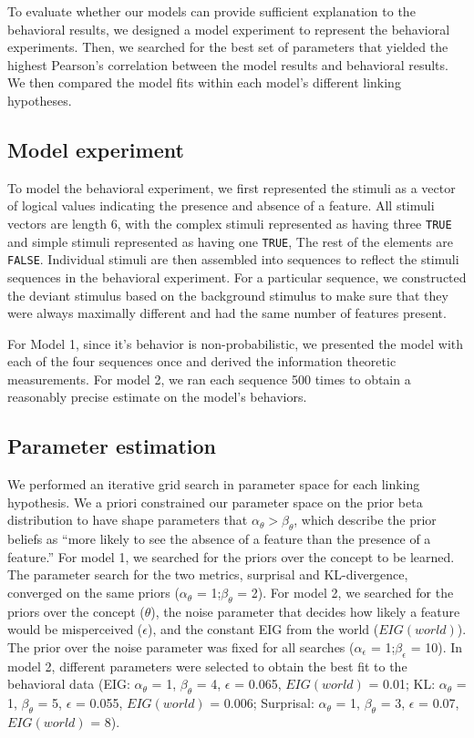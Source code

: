 \documentclass[10pt, letterpaper]{article}
\begin{document}
To evaluate whether our models can provide sufficient explanation to the
behavioral results, we designed a model experiment to represent the
behavioral experiments. Then, we searched for the best set of parameters
that yielded the highest Pearson's correlation between the model results
and behavioral results. We then compared the model fits within each
model's different linking hypotheses.

\hypertarget{model-experiment}{%
\subsection{Model experiment}\label{model-experiment}}

To model the behavioral experiment, we first represented the stimuli as
a vector of logical values indicating the presence and absence of a
feature. All stimuli vectors are length 6, with the complex stimuli
represented as having three \texttt{TRUE} and simple stimuli represented
as having one \texttt{TRUE}, The rest of the elements are
\texttt{FALSE}. Individual stimuli are then assembled into sequences to
reflect the stimuli sequences in the behavioral experiment. For a
particular sequence, we constructed the deviant stimulus based on the
background stimulus to make sure that they were always maximally
different and had the same number of features present.

For Model 1, since it's behavior is non-probabilistic, we presented the
model with each of the four sequences once and derived the information
theoretic measurements. For model 2, we ran each sequence 500 times to
obtain a reasonably precise estimate on the model's behaviors.

\hypertarget{parameter-estimation}{%
\subsection{Parameter estimation}\label{parameter-estimation}}

We performed an iterative grid search in parameter space for each
linking hypothesis. We a priori constrained our parameter space on the
prior beta distribution to have shape parameters that
\(\alpha_{\theta} > \beta_{\theta}\), which describe the prior beliefs
as ``more likely to see the absence of a feature than the presence of a
feature.'' For model 1, we searched for the priors over the concept to
be learned. The parameter search for the two metrics, surprisal and
KL-divergence, converged on the same priors (\(\alpha_{\theta}\) =
1;\(\beta_{\theta}\) = 2). For model 2, we searched for the priors over
the concept (\(\theta\)), the noise parameter that decides how likely a
feature would be misperceived (\(\epsilon\)), and the constant EIG from
the world (\(EIG(world)\)). The prior over the noise parameter was fixed
for all searches (\(\alpha_{\epsilon}\) = 1;\(\beta_{\epsilon}\) = 10).
In model 2, different parameters were selected to obtain the best fit to
the behavioral data (EIG: \(\alpha_{\theta}\) = 1, \(\beta_{\theta}\) =
4, \(\epsilon\) = 0.065, \(EIG(world)\) = 0.01; KL: \(\alpha_{\theta}\)
= 1, \(\beta_{\theta}\) = 5, \(\epsilon\) = 0.055, \(EIG(world)\) =
0.006; Surprisal: \(\alpha_{\theta}\) = 1, \(\beta_{\theta}\) = 3,
\(\epsilon\) = 0.07, \(EIG(world)\) = 8).
\end{document}
